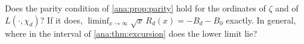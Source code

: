 \begin{question}\label{ana:q:parity}
Does the parity condition of \cref{ana:prop:parity} hold for the ordinates of $\zeta$ and of
$L(\cdot,\chi_d)$? If it does, $\liminf_{x\to\infty}\sqrt x\,R_d(x)=-B_d-B_0$ exactly. In
general, where in the interval of \cref{ana:thm:excursion} does the lower limit lie?
\end{question}
